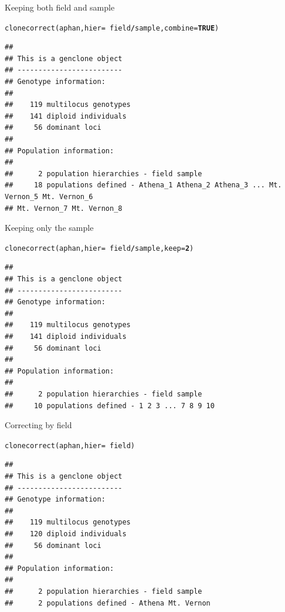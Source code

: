 \documentclass[letterpaper]{article}\usepackage[]{graphicx}\usepackage[]{color}
\makeatletter
\newcommand{\hlnum}[1]{\textcolor[rgb]{0.502,0,0.502}{\textbf{#1}}}%
\newcommand{\hlopt}[1]{\textcolor[rgb]{1,0,0.502}{\textbf{#1}}}%
\newcommand{\hlstd}[1]{\textcolor[rgb]{0,0,0}{#1}}%
\newcommand{\hlkwc}[1]{\textcolor[rgb]{0,0.502,0.753}{#1}}%
\newcommand{\hlkwd}[1]{\textcolor[rgb]{0,0.267,0.4}{#1}}%
\newenvironment{kframe}{%
 \def\at@end@of@kframe{}%
 \ifinner\ifhmode%
  \def\at@end@of@kframe{\end{minipage}}%
  \begin{minipage}{\columnwidth}%
 \fi\fi%
 \def\FrameCommand##1{\hskip\@totalleftmargin \hskip-\fboxsep
 \colorbox{shadecolor}{##1}\hskip-\fboxsep
     \hskip-\linewidth \hskip-\@totalleftmargin \hskip\columnwidth}%
 \MakeFramed {\advance\hsize-\width
   \@totalleftmargin\z@ \linewidth\hsize
   \@setminipage}}%
 {\par\unskip\endMakeFramed%
 \at@end@of@kframe}
\newenvironment{knitrout}{}{} %
\makeatother
\begin{document}
Keeping both field and sample
\begin{knitrout}\footnotesize
{}\color{fgcolor}\begin{kframe}
\begin{alltt}
\hlkwd{clonecorrect}\hlstd{(aphan,} \hlkwc{hier} \hlstd{=} \hlopt{~}\hlstd{field}\hlopt{/}\hlstd{sample,} \hlkwc{combine} \hlstd{=} \hlnum{TRUE}\hlstd{)}
\end{alltt}
\begin{verbatim}
## 
## This is a genclone object
## -------------------------
## Genotype information:
## 
##    119 multilocus genotypes
##    141 diploid individuals
##     56 dominant loci
## 
## Population information:
## 
##      2 population hierarchies - field sample
##     18 populations defined - Athena_1 Athena_2 Athena_3 ... Mt. Vernon_5 Mt. Vernon_6 
## Mt. Vernon_7 Mt. Vernon_8
\end{verbatim}
\end{kframe}
\end{knitrout}

Keeping only the sample
\begin{knitrout}\footnotesize
{}\color{fgcolor}\begin{kframe}
\begin{alltt}
\hlkwd{clonecorrect}\hlstd{(aphan,} \hlkwc{hier} \hlstd{=} \hlopt{~}\hlstd{field}\hlopt{/}\hlstd{sample,} \hlkwc{keep} \hlstd{=} \hlnum{2}\hlstd{)}
\end{alltt}
\begin{verbatim}
## 
## This is a genclone object
## -------------------------
## Genotype information:
## 
##    119 multilocus genotypes
##    141 diploid individuals
##     56 dominant loci
## 
## Population information:
## 
##      2 population hierarchies - field sample
##     10 populations defined - 1 2 3 ... 7 8 9 10
\end{verbatim}
\end{kframe}
\end{knitrout}

Correcting by field
\begin{knitrout}\footnotesize
{}\color{fgcolor}\begin{kframe}
\begin{alltt}
\hlkwd{clonecorrect}\hlstd{(aphan,} \hlkwc{hier} \hlstd{=} \hlopt{~}\hlstd{field)}
\end{alltt}
\begin{verbatim}
## 
## This is a genclone object
## -------------------------
## Genotype information:
## 
##    119 multilocus genotypes
##    120 diploid individuals
##     56 dominant loci
## 
## Population information:
## 
##      2 population hierarchies - field sample
##      2 populations defined - Athena Mt. Vernon
\end{verbatim}
\end{kframe}
\end{knitrout}
\end{document}
